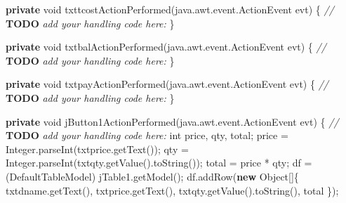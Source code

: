 \documentclass[
  10pt,
]{article}
\newenvironment{Shaded}{}{}
\newcommand{\AlertTok}[1]{\textcolor[rgb]{1.00,0.00,0.00}{\textbf{#1}}}
\newcommand{\BuiltInTok}[1]{\textcolor[rgb]{0.00,0.50,0.00}{#1}}
\newcommand{\CommentTok}[1]{\textcolor[rgb]{0.38,0.63,0.69}{\textit{#1}}}
\newcommand{\DataTypeTok}[1]{\textcolor[rgb]{0.56,0.13,0.00}{#1}}
\newcommand{\FunctionTok}[1]{\textcolor[rgb]{0.02,0.16,0.49}{#1}}
\newcommand{\KeywordTok}[1]{\textcolor[rgb]{0.00,0.44,0.13}{\textbf{#1}}}
\newcommand{\NormalTok}[1]{#1}
\newcommand{\OperatorTok}[1]{\textcolor[rgb]{0.40,0.40,0.40}{#1}}
\begin{document}
\begin{Shaded}
\begin{Highlighting}[numbers=left,,]
    \KeywordTok{private} \DataTypeTok{void} \FunctionTok{txttcostActionPerformed}\OperatorTok{(}\NormalTok{java}\OperatorTok{.}\FunctionTok{awt}\OperatorTok{.}\FunctionTok{event}\OperatorTok{.}\FunctionTok{ActionEvent}\NormalTok{ evt}\OperatorTok{)} \OperatorTok{\{}                                         
        \CommentTok{// }\AlertTok{TODO}\CommentTok{ add your handling code here:}
    \OperatorTok{\}}                                        

    \KeywordTok{private} \DataTypeTok{void} \FunctionTok{txtbalActionPerformed}\OperatorTok{(}\NormalTok{java}\OperatorTok{.}\FunctionTok{awt}\OperatorTok{.}\FunctionTok{event}\OperatorTok{.}\FunctionTok{ActionEvent}\NormalTok{ evt}\OperatorTok{)} \OperatorTok{\{}                                       
        \CommentTok{// }\AlertTok{TODO}\CommentTok{ add your handling code here:}
    \OperatorTok{\}}                                      

    \KeywordTok{private} \DataTypeTok{void} \FunctionTok{txtpayActionPerformed}\OperatorTok{(}\NormalTok{java}\OperatorTok{.}\FunctionTok{awt}\OperatorTok{.}\FunctionTok{event}\OperatorTok{.}\FunctionTok{ActionEvent}\NormalTok{ evt}\OperatorTok{)} \OperatorTok{\{}                                       
        \CommentTok{// }\AlertTok{TODO}\CommentTok{ add your handling code here:}
    \OperatorTok{\}}                                      

    \KeywordTok{private} \DataTypeTok{void} \FunctionTok{jButton1ActionPerformed}\OperatorTok{(}\NormalTok{java}\OperatorTok{.}\FunctionTok{awt}\OperatorTok{.}\FunctionTok{event}\OperatorTok{.}\FunctionTok{ActionEvent}\NormalTok{ evt}\OperatorTok{)} \OperatorTok{\{}                                         
        \CommentTok{// }\AlertTok{TODO}\CommentTok{ add your handling code here:}
        \DataTypeTok{int}\NormalTok{ price}\OperatorTok{,}\NormalTok{ qty}\OperatorTok{,}\NormalTok{ total}\OperatorTok{;}
\NormalTok{        price }\OperatorTok{=} \BuiltInTok{Integer}\OperatorTok{.}\FunctionTok{parseInt}\OperatorTok{(}\NormalTok{txtprice}\OperatorTok{.}\FunctionTok{getText}\OperatorTok{());}
\NormalTok{        qty }\OperatorTok{=} \BuiltInTok{Integer}\OperatorTok{.}\FunctionTok{parseInt}\OperatorTok{(}\NormalTok{txtqty}\OperatorTok{.}\FunctionTok{getValue}\OperatorTok{().}\FunctionTok{toString}\OperatorTok{());}
\NormalTok{        total }\OperatorTok{=}\NormalTok{ price }\OperatorTok{*}\NormalTok{ qty}\OperatorTok{;}
\NormalTok{        df }\OperatorTok{=} \OperatorTok{(}\BuiltInTok{DefaultTableModel}\OperatorTok{)}\NormalTok{ jTable1}\OperatorTok{.}\FunctionTok{getModel}\OperatorTok{();}
\NormalTok{        df}\OperatorTok{.}\FunctionTok{addRow}\OperatorTok{(}\KeywordTok{new} \BuiltInTok{Object}\OperatorTok{[]\{}
\NormalTok{            txtdname}\OperatorTok{.}\FunctionTok{getText}\OperatorTok{(),}
\NormalTok{            txtprice}\OperatorTok{.}\FunctionTok{getText}\OperatorTok{(),}
\NormalTok{            txtqty}\OperatorTok{.}\FunctionTok{getValue}\OperatorTok{().}\FunctionTok{toString}\OperatorTok{(),}
\NormalTok{            total}
        \OperatorTok{\});}


\end{Highlighting}
\end{Shaded}
\end{document}
